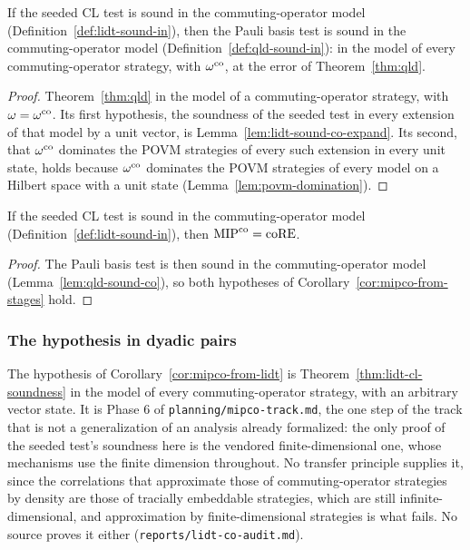 \begin{lemma}
\label{lem:qld-sound-co}
\leanok
If the seeded CL test is sound in the commuting-operator model (Definition~\ref{def:lidt-sound-in}),
then the Pauli basis test is sound in the commuting-operator model
(Definition~\ref{def:qld-sound-in}): in the model of every commuting-operator strategy, with
$\omega^{\mathrm{co}}$, at the error of Theorem~\ref{thm:qld}.
\end{lemma}

\begin{proof}
\leanok
Theorem~\ref{thm:qld} in the model of a commuting-operator strategy, with $\omega = \omega^{\mathrm{co}}$. Its
first hypothesis, the soundness of the seeded test in every extension of that model by a unit
vector, is Lemma~\ref{lem:lidt-sound-co-expand}. Its second, that $\omega^{\mathrm{co}}$ dominates the POVM
strategies of every such extension in every unit state, holds because $\omega^{\mathrm{co}}$ dominates the POVM
strategies of every model on a Hilbert space with a unit state (Lemma~\ref{lem:povm-domination}).
\end{proof}

\begin{corollary}[$\MIPco = \coRE$, from the co-soundness of the low-individual-degree test]
\label{cor:mipco-from-lidt}
\leanok
If the seeded CL test is sound in the commuting-operator model (Definition~\ref{def:lidt-sound-in}),
then $\MIPco = \coRE$.
\end{corollary}

\begin{proof}
\leanok
The Pauli basis test is then sound in the commuting-operator model (Lemma~\ref{lem:qld-sound-co}),
so both hypotheses of Corollary~\ref{cor:mipco-from-stages} hold.
\end{proof}

\subsubsection{The hypothesis in dyadic pairs}
\label{sec:ds-mipco-phase6}

The hypothesis of Corollary~\ref{cor:mipco-from-lidt} is Theorem~\ref{thm:lidt-cl-soundness} in the
model of every commuting-operator strategy, with an arbitrary vector state. It is Phase 6 of
\texttt{planning/mipco-track.md}, the one step of the track that is not a generalization of an
analysis already formalized: the only proof of the seeded test's soundness here is the vendored
finite-dimensional one, whose mechanisms use the finite dimension throughout. No transfer principle
supplies it, since the correlations that approximate those of commuting-operator strategies by
density are those of tracially embeddable strategies, which are still infinite-dimensional, and
approximation by finite-dimensional strategies is what fails. No source proves it either
(\texttt{reports/lidt-co-audit.md}).

